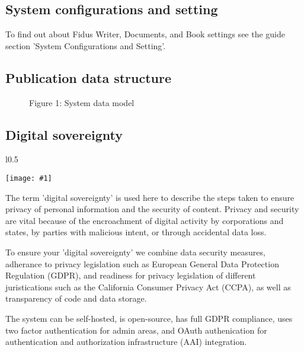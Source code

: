 \documentclass{article}
\newlength{\imgwidth}
\newcommand\scaledgraphics[2]{%
                
\settowidth{\imgwidth}{\texttt{[image: \#1]}}%
                
\setlength{\imgwidth}{\minof{\imgwidth}{#2\textwidth}}%
                
\texttt{[image: \#1]}%
                
}
\begin{document}
\subsection{System configurations and setting}\label{H4870876}



To find out about Fidus Writer, Documents, and Book settings see the guide section 'System Configurations and Setting'.


\subsection{Publication data structure}\label{H4820656}


\begin{figure}

\caption*{Figure 1: System data model}\label{F86281041}
\end{figure}


\subsection{Digital sovereignty}\label{H6425485}


\begin{wrapfigure}{l}{0.5\textwidth}
\scaledgraphics{60a0cd01-c4e1-467e-a517-a5ae77dbbbaf.png}{0.5}
\label{F43863211}
\end{wrapfigure}


The term 'digital sovereignty' is used here to describe the steps taken to ensure privacy of personal information and the security of content. Privacy and security are vital because of the encroachment of digital activity by corporations and states, by parties with malicious intent, or through accidental data loss.


To ensure your 'digital sovereignty' we combine data security measures, adherance to privacy legislation such as European General Data Protection Regulation (GDPR), and readiness for privacy legislation of different juristications such as the California Consumer Privacy Act (CCPA), as well as transparency of code and data storage.


The system can be self-hosted, is open-source, has full GDPR compliance, uses two factor authentication for admin areas, and OAuth authenication for authentication and authorization infrastructure (AAI) integration. 
\end{document}
